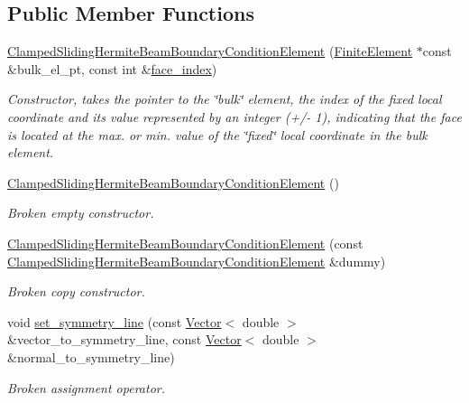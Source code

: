 \subsection*{Public Member Functions}
\begin{DoxyCompactItemize}
\item 
\hyperlink{classoomph_1_1ClampedSlidingHermiteBeamBoundaryConditionElement_ab69f027e05df4ecd7374f8026832e2db}{Clamped\+Sliding\+Hermite\+Beam\+Boundary\+Condition\+Element} (\hyperlink{classoomph_1_1FiniteElement}{Finite\+Element} $\ast$const \&bulk\+\_\+el\+\_\+pt, const int \&\hyperlink{classoomph_1_1FaceElement_a478d577ac6db67ecc80f1f02ae3ab170}{face\+\_\+index})
\begin{DoxyCompactList}\small\item\em Constructor, takes the pointer to the \char`\"{}bulk\char`\"{} element, the index of the fixed local coordinate and its value represented by an integer (+/-\/ 1), indicating that the face is located at the max. or min. value of the \char`\"{}fixed\char`\"{} local coordinate in the bulk element. \end{DoxyCompactList}\item 
\hyperlink{classoomph_1_1ClampedSlidingHermiteBeamBoundaryConditionElement_ae3c06457953887a705f8308023e4f2e1}{Clamped\+Sliding\+Hermite\+Beam\+Boundary\+Condition\+Element} ()
\begin{DoxyCompactList}\small\item\em Broken empty constructor. \end{DoxyCompactList}\item 
\hyperlink{classoomph_1_1ClampedSlidingHermiteBeamBoundaryConditionElement_ac5648dea07535b922e25a4c578a4f8c4}{Clamped\+Sliding\+Hermite\+Beam\+Boundary\+Condition\+Element} (const \hyperlink{classoomph_1_1ClampedSlidingHermiteBeamBoundaryConditionElement}{Clamped\+Sliding\+Hermite\+Beam\+Boundary\+Condition\+Element} \&dummy)
\begin{DoxyCompactList}\small\item\em Broken copy constructor. \end{DoxyCompactList}\item 
void \hyperlink{classoomph_1_1ClampedSlidingHermiteBeamBoundaryConditionElement_a756e8213adbd4d04ebdaa72f50e87a1e}{set\+\_\+symmetry\+\_\+line} (const \hyperlink{classoomph_1_1Vector}{Vector}$<$ double $>$ \&vector\+\_\+to\+\_\+symmetry\+\_\+line, const \hyperlink{classoomph_1_1Vector}{Vector}$<$ double $>$ \&normal\+\_\+to\+\_\+symmetry\+\_\+line)
\begin{DoxyCompactList}\small\item\em Broken assignment operator. \end{DoxyCompactList}\item 

\end{DoxyCompactItemize}
